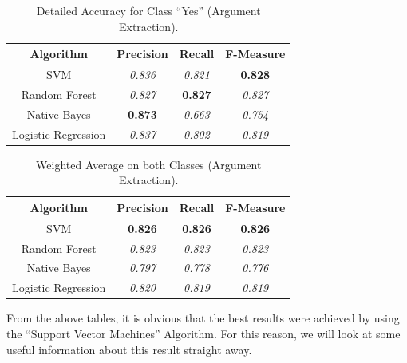 \begin{table}[H]
\centering
\caption{Detailed Accuracy for Class “Yes” (Argument Extraction).}
\label{42_table_ref}
\begin{tabular}{cccc}
\hline
{\bf Algorithm}     & {\bf Precision} & {\bf Recall}    & {\bf F-Measure} \\ \hline
SVM                 & {\it 0.836}     & {\it 0.821}     & {\bf 0.828} \\
Random Forest       & {\it 0.827}     & {\bf 0.827}	   & {\it 0.827}     \\
Native Bayes        & {\bf 0.873} 	 & {\it 0.663}     & {\it 0.754}     \\
Logistic Regression & {\it 0.837}     & {\it 0.802}     & {\it 0.819}     \\ \hline
\end{tabular}
\end{table}

\begin{table}[H]
\centering
\caption{Weighted Average on both Classes (Argument Extraction).}
\label{43_table_ref}
\begin{tabular}{cccc}
\hline
{\bf Algorithm}     & {\bf Precision} & {\bf Recall}    & {\bf F-Measure} \\ \hline
SVM                 & {\bf 0.826} 	 & {\bf 0.826}     & {\bf 0.826} \\
Random Forest       & {\it 0.823}     & {\it 0.823}     & {\it 0.823}     \\
Native Bayes        & {\it 0.797}     & {\it 0.778}     & {\it 0.776}     \\
Logistic Regression & {\it 0.820}     & {\it 0.819}     & {\it 0.819}     \\ \hline
\end{tabular}
\end{table}

From the above tables, it is obvious that the best results were achieved by using the ``Support Vector Machines'' Algorithm. For this reason, we will look at some useful information  about this result straight away.


